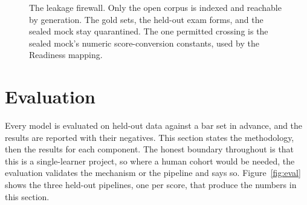 \documentclass[11pt]{article}
\begin{document}
\begin{figure}[t]
\centering
{}
\caption{The leakage firewall. Only the open corpus is indexed and reachable by
generation. The gold sets, the held-out exam forms, and the sealed mock stay quarantined.
The one permitted crossing is the sealed mock's numeric score-conversion constants, used
by the Readiness mapping.}
\label{fig:firewall}
\end{figure}

\section{Evaluation}

Every model is evaluated on held-out data against a bar set in advance, and the
results are reported with their negatives. This section states the methodology, then
the results for each component. The honest boundary throughout is that this is a
single-learner project, so where a human cohort would be needed, the evaluation
validates the mechanism or the pipeline and says so. Figure~\ref{fig:eval} shows the
three held-out pipelines, one per score, that produce the numbers in this section.
\end{document}
